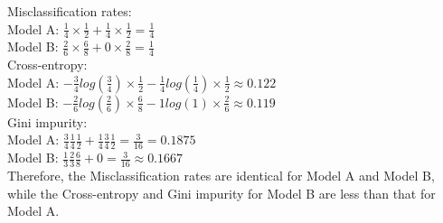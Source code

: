 \documentclass{article}
\begin{document}
Misclassification rates:\\
Model A: $\frac{1}{4} \times \frac{1}{2} +\frac{1}{4} \times \frac{1}{2} = \frac{1}{4}$\\
Model B: $\frac{2}{6} \times \frac{6}{8} +0 \times \frac{2}{8} = \frac{1}{4}$\\

Cross-entropy: \\
Model A: $-\frac{3}{4}log(\frac{3}{4})\times \frac{1}{2} - \frac{1}{4}log(\frac{1}{4})\times \frac{1}{2} \approx 0.122 $\\
Model B: $-\frac{2}{6}log(\frac{2}{6})\times \frac{6}{8} - 1log(1)\times \frac{2}{6}\approx 0.119 $\\

Gini impurity:\\
Model A: $\frac{3}{4}\frac{1}{4}\frac{1}{2} + \frac{1}{4}\frac{3}{4}\frac{1}{2} =  \frac{3}{16} = 0.1875$\\
Model B: $\frac{1}{3}\frac{2}{3}\frac{6}{8} + 0 =  \frac{3}{16} \approx 0.1667$\\

Therefore, the Misclassification rates are identical for Model A and Model B, while the Cross-entropy and Gini impurity for Model B are less than that for Model A.
\end{document}
